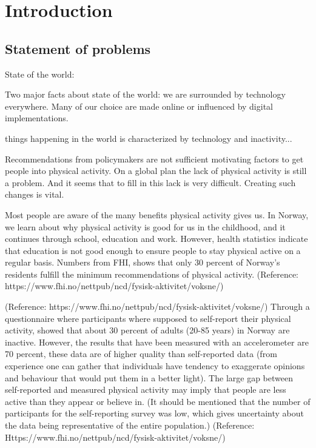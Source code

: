 \chapter{Introduction} 


\section{Statement of problems}
State of the world: 

Two major facts about state of the world: we are surrounded by technology everywhere. Many of our choice are made online or influenced by digital implementations. 

things happening in the world is characterized by technology and inactivity... 

Recommendations from policymakers are not sufficient motivating factors to get people into physical activity. On a global plan the lack of physical activity is still a problem. And it seems that to fill in this lack is very difficult. Creating such changes is vital. 

Most people are aware of the many benefits physical activity gives us. In Norway, we learn about why physical activity is good for us in the childhood, and it continues through school, education and work. However, health statistics indicate that education is not good enough to ensure people to stay physical active on a regular basis. Numbers from FHI, shows that only 30 percent of Norway's residents fulfill the minimum recommendations of physical activity. (Reference: https://www.fhi.no/nettpub/ncd/fysisk-aktivitet/voksne/) 

(Reference: https://www.fhi.no/nettpub/ncd/fysisk-aktivitet/voksne/) Through a questionnaire where participants where supposed to self-report their physical activity, showed that about 30 percent of adults (20-85 years) in Norway are inactive. However, the results that have been measured with an accelerometer are 70 percent, these data are of higher quality than self-reported data (from experience one can gather that individuals have tendency to exaggerate opinions and behaviour that would put them in a better light). The large gap between self-reported and measured physical activity may imply that people are less active than they appear or believe in. (It should be mentioned that the number of participants for the self-reporting survey was low, which gives uncertainty about the data being representative of the entire population.) (Reference: Https://www.fhi.no/nettpub/ncd/fysisk-aktivitet/voksne/)

